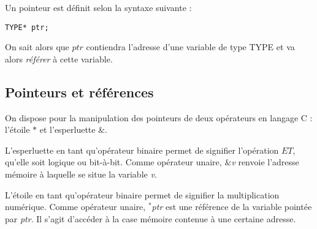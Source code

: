 \documentclass[../../../main.tex]{subfiles}
\begin{document}
 
Un pointeur est définit selon la syntaxe suivante :
\begin{verbatim}
TYPE* ptr;
\end{verbatim}
On sait alors que $ptr$ contiendra l'adresse d'une variable de type \textsf{TYPE} et va alors \textit{référer} à cette variable.

\subsection{Pointeurs et références}

On dispose pour la manipulation des pointeurs de deux opérateurs en langage C : l'étoile $\ast$ et l'esperluette $\&$.

L'esperluette en tant qu'opérateur binaire permet de signifier l'opération $ET$, qu'elle soit logique ou bit-à-bit. Comme opérateur unaire, \textit{$\&$v} renvoie l'adresse mémoire à laquelle se situe la variable \textit{v}. 

L'étoile en tant qu'opérateur binaire permet de signifier la multiplication numérique. Comme opérateur unaire, \textit{$^*$ptr} est une référence de la variable pointée par \textit{ptr}. Il s'agit d'accéder à la case mémoire contenue à une certaine adresse.

\begin{minipage}{\textwidth}
	\begin{center}
		
	\end{center}
\end{minipage}
\end{document}
